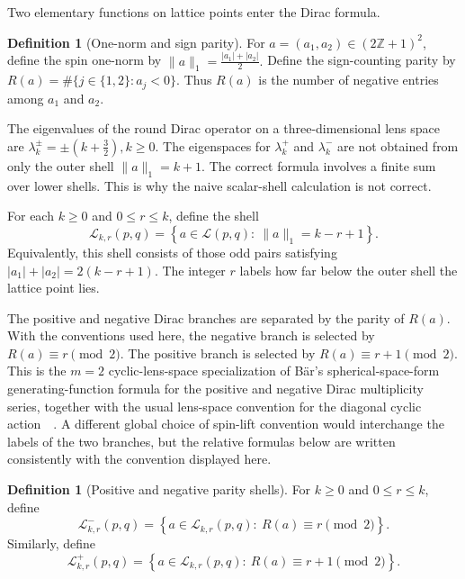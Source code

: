\documentclass{article}
\theoremstyle{definition}
\newtheorem{definition}[theorem]{Definition}
\numberwithin{equation}{section}
\begin{document}
Two elementary functions on lattice points enter the Dirac formula.

\begin{definition}[One-norm and sign parity]
For $a=(a_1,a_2)\in(2\mathbb Z+1)^2$, define the spin one-norm by $\|a\|_1=\frac{|a_1|+|a_2|}{2}.$ Define the sign-counting parity by $R(a)=\#\{j\in\{1,2\}:a_j<0\}.$ Thus $R(a)$ is the number of negative entries among $a_1$ and $a_2$.
\end{definition}

The eigenvalues of the round Dirac operator on a three-dimensional lens space are $\lambda_k^\pm=\pm\left(k+\frac32\right), k\geq0.$ The eigenspaces for $\lambda_k^+$ and $\lambda_k^-$ are not obtained from only the outer shell $\|a\|_1=k+1$.  The correct formula involves a finite sum over lower shells.  This is why the naive scalar-shell calculation is not correct.

For each $k\geq0$ and $0\leq r\leq k$, define the shell
\begin{equation}
\mathcal L_{k,r}(p,q)=\left\{a\in\mathcal L(p,q):\ \|a\|_1=k-r+1\right\}.
\end{equation}
Equivalently, this shell consists of those odd pairs satisfying $|a_1|+|a_2|=2(k-r+1).$ The integer $r$ labels how far below the outer shell the lattice point lies.

The positive and negative Dirac branches are separated by the parity of $R(a)$.  With the conventions used here, the negative branch is selected by $R(a)\equiv r\pmod2.$ The positive branch is selected by $R(a)\equiv r+1\pmod2.$ This is the $m=2$ cyclic-lens-space specialization of B\"ar's spherical-space-form generating-function formula for the positive and negative Dirac multiplicity series, together with the usual lens-space convention for the diagonal cyclic action~\cite[Theorem~2]{BaerSpaceForms}~\cite[Chapter~5]{GilkeySpherical}.  A different global choice of spin-lift convention would interchange the labels of the two branches, but the relative formulas below are written consistently with the convention displayed here.  \begin{definition}[Positive and negative parity shells]
For $k\geq0$ and $0\leq r\leq k$, define
\begin{equation}
\mathcal L_{k,r}^-(p,q)=\left\{a\in\mathcal L_{k,r}(p,q):\ R(a)\equiv r\pmod2\right\}.
\end{equation}
Similarly, define
\begin{equation}
\mathcal L_{k,r}^+(p,q)=\left\{a\in\mathcal L_{k,r}(p,q):\ R(a)\equiv r+1\pmod2\right\}.
\end{equation}
\end{definition}
\end{document}
